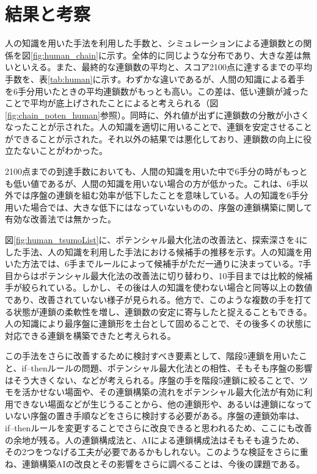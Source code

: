 \documentclass[12pt]{jreport}
\begin{document}
\section{結果と考察}
人の知識を用いた手法を利用した手数と、シミュレーションによる連鎖数との関係を図\ref{fig:human_chain}に示す。全体的に同じような分布であり、大きな差は無いといえる。また、最終的な連鎖数の平均と、スコア2100点に達するまでの平均手数を、表\ref{tab:human}に示す。わずかな違いであるが、人間の知識による着手を6手分用いたときの平均連鎖数がもっとも高い。この差は、低い連鎖が減ったことで平均が底上げされたことによると考えられる（図\ref{fig:chain_poten_human}参照）。同時に、外れ値が出ずに連鎖数の分散が小さくなったことが示された。人の知識を適切に用いることで、連鎖を安定させることができることが示された。それ以外の結果では悪化しており、連鎖数の向上に役立たないことがわかった。

2100点までの到達手数においても、人間の知識を用いた中で6手分の時がもっとも低い値であるが、人間の知識を用いない場合の方が低かった。これは、6手以外では序盤の連鎖を組む効率が低下したことを意味している。人の知識を6手分用いた場合では、大きな低下にはなっていないものの、序盤の連鎖構築に関して有効な改善法では無かった。

図\ref{fig:human_tsumoList}に、ポテンシャル最大化法の改善法と、探索深さを4にした手法、人の知識を利用した手法における候補手の推移を示す。人の知識を用いた方法では、6手までルールによって候補手がただ一通りに決まっている。7手目からはポテンシャル最大化法の改善法に切り替わり、10手目までは比較的候補手が絞られている。しかし、その後は人の知識を使わない場合と同等以上の数値であり、改善されていない様子が見られる。他方で、このような複数の手を打てる状態が連鎖の柔軟性を増し、連鎖数の安定に寄与したと捉えることもできる。人の知識により最序盤に連鎖形を土台として固めることで、その後多くの状態に対応できる連鎖を構築できたと考えられる。

この手法をさらに改善するために検討すべき要素として、階段5連鎖を用いたこと、if--thenルールの問題、ポテンシャル最大化法との相性、そもそも序盤の影響はそう大きくない、などが考えられる。序盤の手を階段5連鎖に絞ることで、ツモを活かせない場面や、その連鎖構築の流れをポテンシャル最大化法が有効に利用できない場面などが生じうることから、他の連鎖形や、あるいは連鎖になっていない序盤の置き手順などをさらに検討する必要がある。序盤の連鎖効率は、if--thenルールを変更することでさらに改良できると思われるため、ここにも改善の余地が残る。人の連鎖構成法と、AIによる連鎖構成法はそもそも違うため、その2つをつなげる工夫が必要であるかもしれない。このような検証をさらに重ね、連鎖構築AIの改良とその影響をさらに調べることは、今後の課題である。
\end{document}
